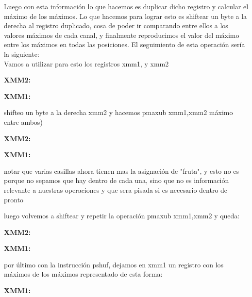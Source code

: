  Luego con esta información lo que hacemos es duplicar dicho registro y calcular el máximo de los máximos. Lo que hacemos para lograr esto es shiftear un byte a la derecha al registro duplicado, cosa de poder ir comparando entre ellos a los valores máximos de cada canal, y finalmente reproducimos el valor del máximo entre los máximos en todas las posiciones. El seguimiento de esta operación sería la siguiente: 
\\Vamos a utilizar para esto los registros xmm1, y xmm2
\\
\par{\textbf{XMM2:}}
\par{\textbf{XMM1:}}
\par{shifteo un byte a la derecha xmm2 y hacemos pmaxub xmm1,xmm2  máximo entre ambos)}
\par{\textbf{XMM2:}}

\par{\textbf{XMM1:}}
\par {notar que varias casillas ahora tienen mas la asignación de "fruta", y esto no es porque no sepamos que hay dentro de cada una, sino que no es información relevante a nuestras operaciones y que sera pisada si es necesario dentro de pronto}
\par{luego volvemos a shiftear y repetir la operación pmaxub xmm1,xmm2  y queda: }

\par{\textbf{XMM2:}}

\par{\textbf{XMM1:}}
\par{por último con la instrucción pshuf, dejamos en xmm1 un registro con los máximos de los máximos representado de esta forma: }
\par{\textbf{XMM1:}}


